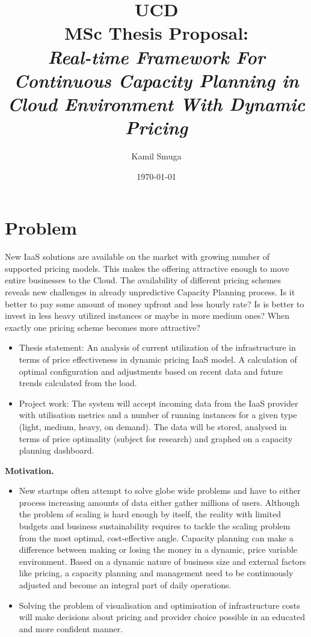 \documentclass[11pt]{artikel3}
\title{UCD\\MSc Thesis Proposal:\\\emph{Real-time Framework For Continuous Capacity Planning in Cloud Environment With Dynamic Pricing}}
\author{Kamil Smuga}
\date{\today}
\begin{document}
\maketitle

\section{Problem}

New IaaS solutions are available on the market with growing number of supported pricing models. This makes the offering attractive enough to move entire businesses to the Cloud. The availability of different pricing schemes reveals new challenges in already unpredictive Capacity Planning process. Is it better to pay some amount of money upfront and less hourly rate? Is is better to invest in less heavy utilized instances or maybe in more medium ones? When exactly one pricing scheme becomes more attractive?

\begin{itemize}
  \item Thesis statement: An analysis of current utilization of the infrastructure in terms of price effectiveness in dynamic pricing IaaS model. A calculation of optimal configuration and adjustments based on recent data and future trends calculated from the load. 
  \item Project work: The system will accept incoming data from the IaaS provider with utilisation metrics and a number of running instances for a given type (light, medium, heavy, on demand). The data will be stored, analysed in terms of price optimality (subject for research) and graphed on a capacity planning dashboard.  
\end{itemize}

{\bf Motivation.} 
\begin{itemize}
  \item New startups often attempt to solve globe wide problems and have to either process increasing amounts of data either gather millions of users. Although the problem of scaling is hard enough by itself, the reality with limited budgets and business sustainability requires to tackle the scaling problem from the most optimal, cost-effective angle. Capacity planning can make a difference between making or losing the money in a dynamic, price variable environment. Based on a dynamic nature of business size and external factors like pricing, a capacity planning and management need to be continuously adjusted and become an integral part of daily operations. 
  \item Solving the problem of visualisation and optimisation of infrastructure costs will make decisions about pricing and provider choice possible in an educated and more  confident manner. 
  
\end{itemize}
\end{document}
